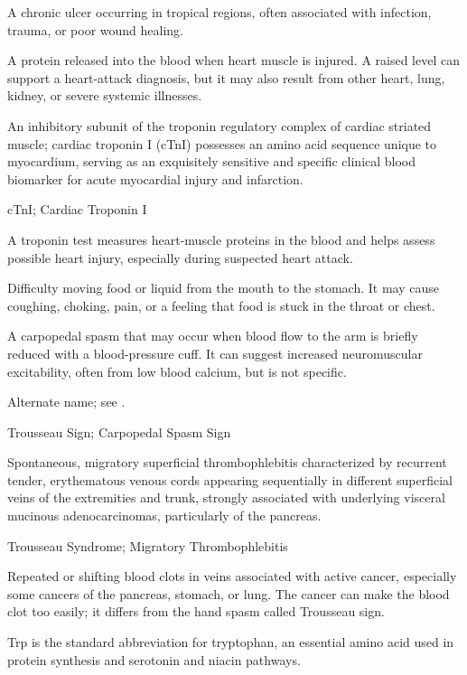  A chronic ulcer occurring in tropical regions, often associated with infection, trauma, or poor wound healing.

 A protein released into the blood when heart muscle is injured. A raised level can support a heart-attack diagnosis, but it may also result from other heart, lung, kidney, or severe systemic illnesses.

 An inhibitory subunit of the troponin regulatory complex of cardiac striated muscle; cardiac troponin I (cTnI) possesses an amino acid sequence unique to myocardium, serving as an exquisitely sensitive and specific clinical blood biomarker for acute myocardial injury and infarction.

\synonyms
cTnI; Cardiac Troponin I

 A troponin test measures heart-muscle proteins in the blood and helps assess possible heart injury, especially during suspected heart attack.

 Difficulty moving food or liquid from the mouth to the stomach. It may cause coughing, choking, pain, or a feeling that food is stuck in the throat or chest.

 A carpopedal spasm that may occur when blood flow to the arm is briefly reduced with a blood-pressure cuff. It can suggest increased neuromuscular excitability, often from low blood calcium, but is not specific.

 Alternate name; see .

\synonyms
Trousseau Sign; Carpopedal Spasm Sign

 Spontaneous, migratory superficial thrombophlebitis characterized by recurrent tender, erythematous venous cords appearing sequentially in different superficial veins of the extremities and trunk, strongly associated with underlying visceral mucinous adenocarcinomas, particularly of the pancreas.

\synonyms
Trousseau Syndrome; Migratory Thrombophlebitis

 Repeated or shifting blood clots in veins associated with active cancer, especially some cancers of the pancreas, stomach, or lung. The cancer can make the blood clot too easily; it differs from the hand spasm called Trousseau sign.

 Trp is the standard abbreviation for tryptophan, an essential amino acid used in protein synthesis and serotonin and niacin pathways.

